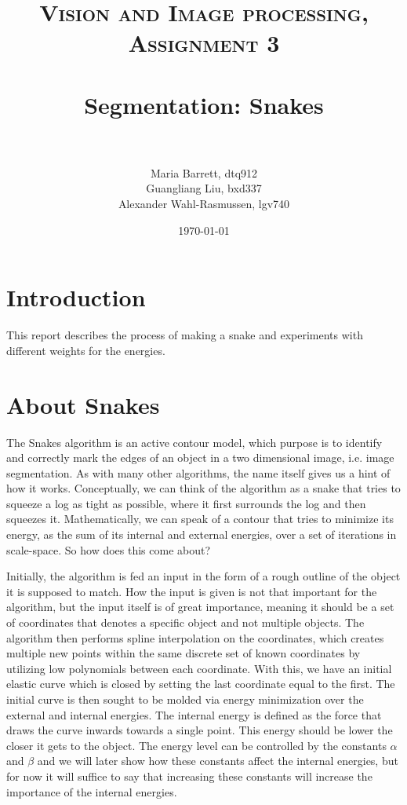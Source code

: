 \documentclass[paper=a4, fontsize=11pt]{scrartcl} %
\title{	
\normalfont \normalsize 
\textsc{Vision and Image processing,  Assignment 3} \\ [25pt] %
\horrule{0.5pt} \\[0.4cm] %
\huge Segmentation: Snakes \\ %
\horrule{2pt} \\[0.5cm] %
}
\author{Maria Barrett, dtq912\\Guangliang Liu, bxd337\\Alexander Wahl-Rasmussen, lgv740} %
\date{\normalsize\today} %
\numberwithin{equation}{section} %
\numberwithin{figure}{section} %
\numberwithin{table}{section} %
\begin{document}
\maketitle %

\section{Introduction}
This report describes the process of making a snake and experiments with different weights for the energies. 
\

\section{About Snakes}
The Snakes algorithm is an active contour model, which purpose is to identify and correctly mark the edges of an object in a two dimensional image, i.e. image segmentation. As with many other algorithms, the name itself gives us a hint of how it works. Conceptually, we can think of the algorithm as a snake that tries to squeeze a log as tight as possible, where it first surrounds the log and then squeezes it. Mathematically, we can speak of a contour that tries to minimize its energy, as the sum of its internal and external energies, over a set of iterations in scale-space. So how does this come about?
\

Initially, the algorithm is fed an input in the form of a rough outline of the object it is supposed to match. How the input is given is not that important for the algorithm, but the input itself is of great importance, meaning it should be a set of coordinates that denotes a specific object and not multiple objects. The algorithm then performs spline interpolation on the coordinates, which creates multiple new points within the same discrete set of known coordinates by utilizing low polynomials between each coordinate. With this, we have an initial elastic curve which is closed by setting the last coordinate equal to the first. The initial curve is then sought to be molded via energy minimization over the external and internal energies. The internal energy is defined as the force that draws the curve inwards towards a single point. This energy should be lower the closer it gets to the object. The energy level can be controlled by the constants $\alpha$ and $\beta$ and we will later show how these constants affect the internal energies, but for now it will suffice to say that increasing these constants will increase the importance of the internal energies. 
\
\end{document}
